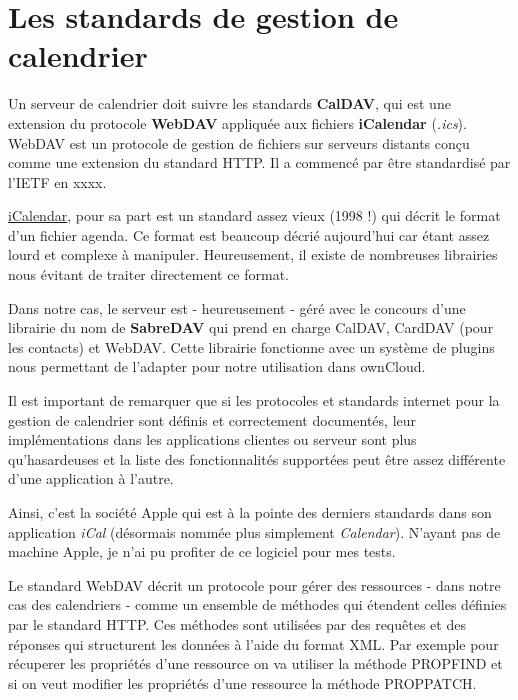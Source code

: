 \documentclass[10pt,a4paper]{report}
\begin{document}
	\section{Les standards de gestion de calendrier}
	Un serveur de calendrier doit suivre les standards \textbf{CalDAV}, qui est une extension du protocole \textbf{WebDAV} appliquée aux fichiers \textbf{iCalendar} (\textit{.ics}). WebDAV est un protocole de gestion de fichiers sur serveurs distants conçu comme une extension du standard HTTP. Il a commencé par être standardisé par l'IETF en xxxx.
	
	\href{https://tools.ietf.org/html/rfc2445}{iCalendar}, pour sa part est un standard assez vieux (1998 !) qui décrit le format d'un fichier agenda. Ce format est beaucoup décrié aujourd'hui car étant assez lourd et complexe à manipuler. Heureusement, il existe de nombreuses librairies nous évitant de traiter directement ce format.
	
	Dans notre cas, le serveur est - heureusement - géré avec le concours d'une librairie du nom de \textbf{SabreDAV} qui prend en charge CalDAV, CardDAV (pour les contacts) et WebDAV. Cette librairie fonctionne avec un système de plugins nous permettant de l'adapter pour notre utilisation dans ownCloud.
	
	Il est important de remarquer que si les protocoles et standards internet pour la gestion de calendrier sont définis et correctement documentés, leur implémentations dans les applications clientes ou serveur sont plus qu'hasardeuses et la liste des fonctionnalités supportées peut être assez différente d'une application à l'autre.
	
	Ainsi, c'est la société Apple qui est à la pointe des derniers standards dans son application \textit{iCal} (désormais nommée plus simplement \textit{Calendar}). N'ayant pas de machine Apple, je n'ai pu profiter de ce logiciel pour mes tests.
	
	Le standard WebDAV décrit un protocole pour gérer des ressources - dans notre cas des calendriers - comme un ensemble de méthodes qui étendent celles définies par le standard HTTP. Ces méthodes sont utilisées par des requêtes et des réponses qui structurent les données à l'aide du format XML. Par exemple pour récuperer les propriétés d'une ressource on va utiliser la méthode PROPFIND et si on veut modifier les propriétés d'une ressource la méthode PROPPATCH.
	
\end{document}
